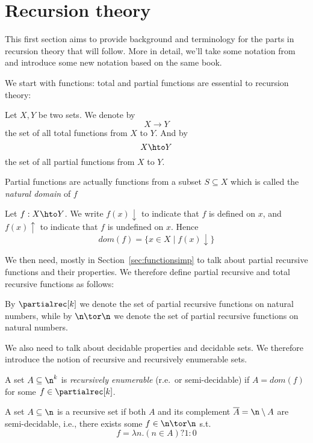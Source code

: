 \section{Recursion theory}\label{sec:two}


This first section aims to provide background and terminology for the
parts in recursion theory that will follow. More in detail, we'll take
some notation from~\cite{cutland1980computability} and introduce some
new notation based on the same book.

We start with functions: total and partial functions are essential to
recursion theory:

\begin{definition}
  Let \(X,Y\) be two sets. We denote by \[X \to Y\] the set of all
  total functions from \(X\) to \(Y\).  And by
  \[X \hto Y\] the set of all partial functions from \(X\) to
  \(Y\).
\end{definition}
\noindent

Partial functions are actually functions from a subset
\(S \subseteq X\) which is called the \emph{natural domain} of \(f\)

\begin{definition}
  Let \(f : X \hto Y\). We write \(f(x)\downarrow\) to indicate that
  \(f\) is defined on \(x\), and \(f(x)\uparrow\) to indicate that
  \(f\) is undefined on \(x\). Hence
  \[dom(f) = \{x \in X \mid f(x)\downarrow\}\]
\end{definition}

We then need, mostly in Section~\ref{sec:functionsimp} to talk about
partial recursive functions and their properties. We therefore define
partial recursive and total recursive functions as follows:

\begin{notation}\label{bg:partialrec}
  By \(\partialrec[k]\) we denote the set of partial recursive
  functions on natural numbers, while by \(\n \tor \n\) we denote the
  set of partial recursive functions on natural numbers.
\end{notation}

We also need to talk about decidable properties and decidable sets. We
therefore introduce the notion of recursive and recursively enumerable
sets.

\begin{definition}
  A set \(A \subseteq \n^k\) is \emph{recursively enumerable} (r.e.\
  or semi-decidable) if \(A = dom(f)\) for some
  \(f \in \partialrec[k]\).
  
  A set \(A\subseteq \n\) is a recursive set if both \(A\) and its
  complement \(\overline{A} = \n \setminus A\) are semi-decidable,
  i.e., there exists some \(f \in \n \tor \n\) s.t.
  \[f = \lambda n . (n \in A) ? 1 : 0\]
\end{definition}

